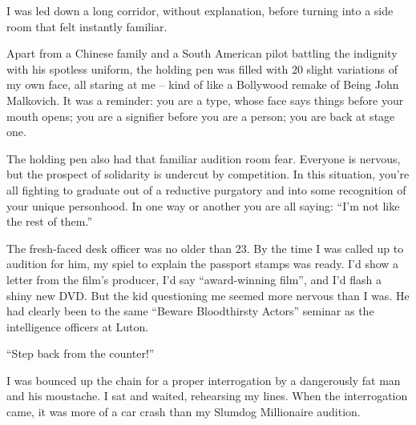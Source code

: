 \documentclass[10pt,a4paper]{article}
\begin{document}
I was led down a long corridor, without explanation, before turning into a side room that felt instantly familiar.

Apart from a Chinese family and a South American pilot battling the indignity with his spotless uniform, the holding pen was filled with 20 slight variations of my own face, all staring at me – kind of like a Bollywood remake of Being John Malkovich. It was a reminder: you are a type, whose face says things before your mouth opens; you are a signifier before you are a person; you are back at stage one.

The holding pen also had that familiar audition room fear. Everyone is nervous, but the prospect of solidarity is undercut by competition. In this situation, you’re all fighting to graduate out of a reductive purgatory and into some recognition of your unique personhood. In one way or another you are all saying: “I’m not like the rest of them.”

The fresh-faced desk officer was no older than 23. By the time I was called up to audition for him, my spiel to explain the passport stamps was ready. I’d show a letter from the film’s producer, I’d say “award-winning film”, and I’d flash a shiny new DVD. But the kid questioning me seemed more nervous than I was. He had clearly been to the same “Beware Bloodthirsty Actors” seminar as the intelligence officers at Luton.

“Step back from the counter!”

I was bounced up the chain for a proper interrogation by a dangerously fat man and his moustache. I sat and waited, rehearsing my lines. When the interrogation came, it was more of a car crash than my Slumdog Millionaire audition.
\end{document}
